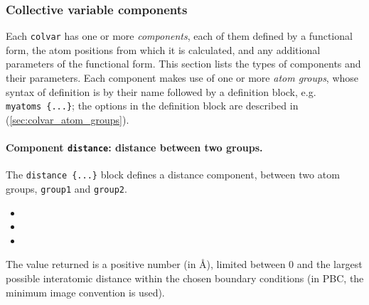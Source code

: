 \subsubsection*{Collective variable components}
\label{sec:cvc}

Each \texttt{colvar} has one or more \emph{components}, each of them
defined by a functional form, the atom positions from which it is
calculated, and any additional parameters of the functional form.
This section lists the types of components and their parameters.  Each
component makes use of one or more \emph{atom groups}, whose syntax of
definition is by their name followed by a definition block, e.g.
\texttt{myatoms~\{...\}}; the options in the definition
block are described in (\ref{sec:colvar_atom_groups}).


\paragraph*{Component \texttt{distance}: distance between two groups.}
The \texttt{distance \{...\}} block defines a distance component,
between two atom groups, \texttt{group1} and \texttt{group2}.
\begin{itemize}
\item %
\item %
\item %
\end{itemize}

The value returned is a positive number (in \AA), limited
between $0$ and the largest possible interatomic distance
within the chosen boundary conditions (in PBC, the minimum image
convention is used).


